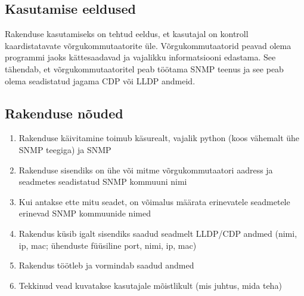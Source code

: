 \documentclass[12pt]{article}
\begin{document}
\subsection{Kasutamise eeldused}
Rakenduse kasutamiseks on tehtud eeldus, et kasutajal on kontroll kaardistatavate võrgukommutaatorite üle.
Võrgukommutaatorid peavad olema programmi jaoks kättesaadavad ja vajalikku informatsiooni edastama.
See tähendab, et võrgukommutaatoritel peab töötama SNMP teenus ja see peab olema seadistatud jagama
CDP või LLDP andmeid.

\subsection{Rakenduse nõuded}
\begin{enumerate}
    \item Rakenduse käivitamine toimub käsurealt, vajalik python (koos vähemalt ühe SNMP teegiga)
    ja SNMP
    \item Rakenduse sisendiks on ühe või mitme võrgukommutaatori aadress ja seadmetes seadistatud
    SNMP kommuuni nimi
    \item \label{itm:req:diffcommunities} Kui antakse ette mitu seadet, on võimalus määrata
    erinevatele seadmetele erinevad SNMP kommuunide nimed

    \item Rakendus küsib igalt sisendiks saadud seadmelt LLDP/CDP andmed (nimi, ip, mac; ühenduste füüsiline port, nimi, ip, mac)
    \item Rakendus töötleb ja vormindab saadud andmed
    \item Tekkinud vead kuvatakse kasutajale mõistlikult (mis juhtus, mida teha)


\end{enumerate}
\end{document}
